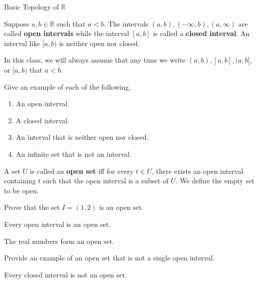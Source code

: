 \begin{section}{Basic Topology of $\mathbb{R}$}
\begin{definition}
Suppose $a,b\in\mathbb{R}$ such that $a<b$.  The intervals $(a,b), (-\infty,b), (a,\infty)$ are called \textbf{open intervals} while the interval $[a,b]$ is called a \textbf{closed interval}.  An interval like $[a,b)$ is neither open nor closed.
\end{definition}

\begin{remark} 
In this class, we will always assume that any time we write $(a,b), [a,b], (a,b]$, or $[a,b)$ that $a<b$. 
\end{remark}

\begin{exercise} Give an example of each of the following.
\begin{enumerate}
\item An open interval.
\item A closed interval.
\item An interval that is neither open nor closed.
\item An infinite set that is not an interval.
\end{enumerate}
\end{exercise}

\begin{definition}
A set $U$ is called an \textbf{open set} iff for every $t \in U$, there exists an open interval containing $t$ such that the open interval is a subset of $U$.  We define the empty set to be open.\end{definition}

\begin{problem} 
Prove that the set $I=(1,2)$ is an open set.
\end{problem}

\begin{theorem}[*]
Every open interval is an open set. 
\end{theorem}

\begin{theorem}
The real numbers form an open set.
\end{theorem}

\begin{exercise}
Provide an example of an open set that is not a single open interval.
\end{exercise}

\begin{theorem}[*]
Every closed interval is not an open set.
\end{theorem}


\end{section}
